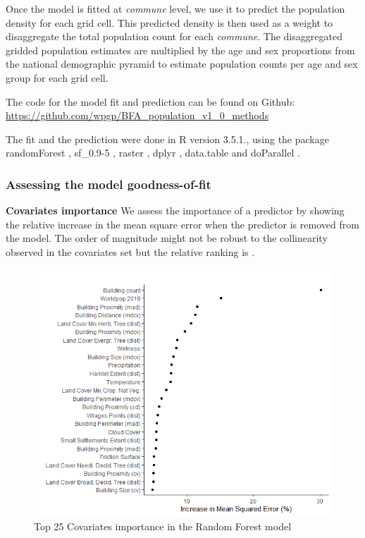 \documentclass[]{book}
\begin{document}
Once the model is fitted at \emph{commune} level, we use it to predict
the population density for each grid cell. This predicted density is
then used as a weight to disaggregate the total population count for
each \emph{commune}. The disaggregated gridded population estimates are
multiplied by the age and sex proportions from the national demographic
pyramid to estimate population counts per age and sex group for each
grid cell.

The code for the model fit and prediction can be found on Github:
\url{https://github.com/wpgp/BFA_population_v1_0_methods}

The fit and the prediction were done in R version 3.5.1., using the
package randomForest \citep{cutler2018}, sf\_0.9-5 \citep{pebesma2020},
raster \citep{hijmans2020}, dplyr \citep{wickham2020}, data.table
\citep{dowle2020} and doParallel \citep{wallig2020}.

\subsubsection{Assessing the model
goodness-of-fit}\label{assessing-the-model-goodness-of-fit-1}

\textbf{Covariates importance} We assess the importance of a predictor
by showing the relative increase in the mean square error when the
predictor is removed from the model. The order of magnitude might not be
robust to the collinearity observed in the covariates set but the
relative ranking is \citep{genuer2010variable}.

\begin{figure}

{\centering \includegraphics[width=0.6\linewidth]{dat/BFAv1/imp_plot} 

}

\caption{Top 25 Covariates importance in the Random Forest model}\label{fig:imp}
\end{figure}
\end{document}
